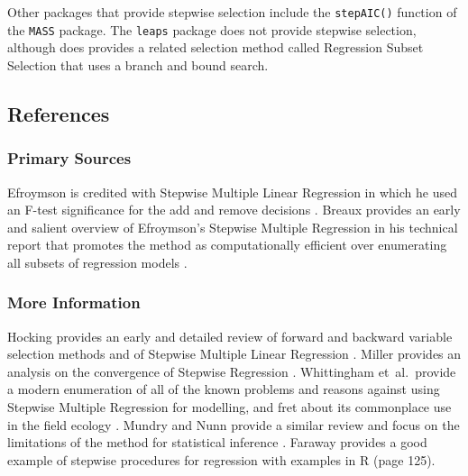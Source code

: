 Other packages that provide stepwise selection include the \texttt{stepAIC()} function of the \texttt{MASS} package. The \texttt{leaps} package does not provide stepwise selection, although does provides a related selection method called Regression Subset Selection that uses a branch and bound search.

\subsection{References}

\subsubsection{Primary Sources}
Efroymson is credited with Stepwise Multiple Linear Regression in which he used an F-test significance for the add and remove decisions \cite{Efroymson1960}.
Breaux provides an early and salient overview of Efroymson's Stepwise Multiple Regression in his technical report that promotes the method as computationally efficient over enumerating all subsets of regression models \cite{Breaux1967}.

\subsubsection{More Information}
Hocking provides an early and detailed review of forward and backward variable selection methods and of Stepwise Multiple Linear Regression \cite{Hocking1976}.
Miller provides an analysis on the convergence of Stepwise Regression \cite{Miller1996}.
Whittingham et~al.\ provide a modern enumeration of all of the known problems and reasons against using Stepwise Multiple Regression for modelling, and fret about its commonplace use in the field ecology \cite{Whittingham2006}.
Mundry and Nunn provide a similar review and focus on the limitations of the method for statistical inference \cite{Mundry2009}.
Faraway provides a good example of stepwise procedures for regression with examples in R \cite{Faraway2002} (page 125).


